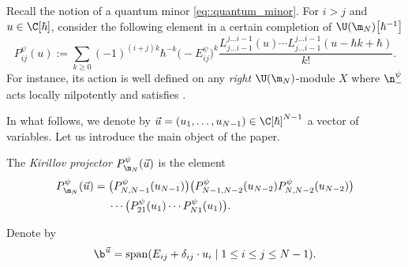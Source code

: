 	
	Recall the notion of a quantum minor \eqref{eq::quantum_minor}. For $i>j$ and $u\in \C[\hbar]$, consider the following element in a certain completion of $\U(\m_N)\bigl[\hbar^{-1}\bigr]$
	\begin{equation}
		\label{eq::kirillov_proj_term}
		P^{\psi}_{ij}(u) := \sum\limits_{k\geq 0} (-1)^{(i+j)k} \hbar^{-k} \bigl(-E_{ij}^{\psi}\bigr)^k \frac{L_{j\dots i-1}^{j \dots i-1}(u) \cdots L_{j\dots i-1}^{j \dots i-1}(u - \hbar k+\hbar) }{k!}.
	\end{equation}
	For instance, its action is well defined on any \emph{right} $\U(\m_N)$-module $X$ where $\n_-^{\psi}$ acts locally nilpotently and satisfies .
	
	In what follows, we denote by $\vec{u}=(u_1,\dots,u_{N-1}) \in \C[\hbar]^{{N-1}}$ a vector of variables. Let us introduce the main object of the paper.
	\begin{Definition}
		\label{def::kirillov_projector}
		The \emph{Kirillov projector} $P_{\m_N}^{\psi}(\vec{u})$ is the element
		\begin{align}
				P_{\m_N}^{\psi}(\vec{u})={}&\bigl(P^{\psi}_{N,N-1}(u_{N-1}) \bigr) \bigl( P_{N-1,N-2}^{\psi}(u_{N-2}) P_{N,N-2}^{\psi}(u_{N-2}) \bigr)\nonumber\\& \cdots \bigl( P_{21}^{\psi}(u_1) \cdots P_{N1}^{\psi}(u_1)\bigr).\label{eq::kirillov_proj}
		\end{align}
	\end{Definition}
	
	
	Denote by
	\begin{equation}
		\label{eq::borel_u}
		\b^{\vec{u}} = \mathrm{span}(E_{ij} + \delta_{ij} \cdot u_i \mid 1\leq i \leq j \leq N-1).
	\end{equation}
	
